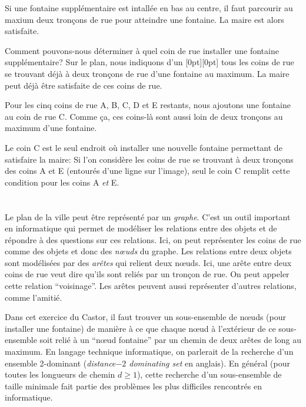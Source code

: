 {{{\centering%
\par}

Si une fontaine supplémentaire est intallée en bas au centre, il faut parcourir au maxium deux tronçons de rue pour atteindre une fontaine. La maire est alors satisfaite.

Comment pouvons-nous déterminer à quel coin de rue installer une fontaine supplémentaire? Sur le plan, nous indiquons d’un \raisebox{-0.5ex}[0pt][0pt]{} tous les coins de rue se trouvant déjà à deux tronçons de rue d’une fontaine au maximum. La maire peut déjà être satisfaite de ces coins de rue.

{\centering%
\par}

Pour les cinq coins de rue A, B, C, D et E restants, nous ajoutons une fontaine au coin de rue C. Comme ça, ces coins-là sont aussi loin de deux tronçons au maximum d’une fontaine.

Le coin C est le seul endroit où installer une nouvelle fontaine permettant de satisfaire la maire:
Si l’on considère les coins de rue se trouvant à deux tronçons des coins A et E (entourés d’une ligne sur l’image), seul le coin C remplit cette condition pour les coins A \emph{et} E.



\section*{\BrochureItsInformatics}
Le plan de la ville peut être représenté par un \emph{graphe}. C’est un outil important en informatique qui permet de modéliser les relations entre des objets et de répondre à des questions sur ces relations. Ici, on peut représenter les coins de rue comme des objets et donc des \emph{nœuds} du graphe. Les relations entre deux objets sont modélisées par des \emph{arêtes} qui relient deux nœuds. Ici, une arête entre deux coins de rue veut dire qu’ils sont reliés par un tronçon de rue. On peut appeler cette relation “voisinage”. Les arêtes peuvent aussi représenter d’autres relations, comme l’amitié.

Dans cet exercice du Castor, il faut trouver un sous-ensemble de nœuds (pour installer une fontaine) de manière à ce que chaque nœud à l’extérieur de ce sous-ensemble soit relié à un “nœud fontaine” par un chemin de deux arêtes de long au maximum. En langage technique informatique, on parlerait de la recherche d’un ensemble 2-dominant (\emph{distance$-2$ dominating set} en anglais). En général (pour toutes les longueurs de chemin ${d \geq 1}$), cette recherche d’un sous-ensemble de taille minimale fait partie des problèmes les plus difficiles rencontrés en informatique.

}}
